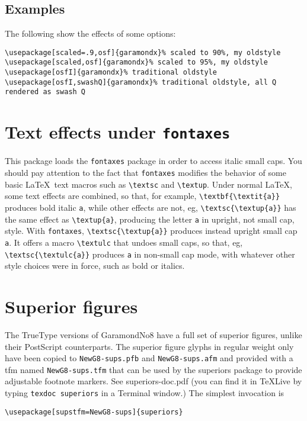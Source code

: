 \documentclass[11pt]{article}
\begin{document}
\subsection{Examples} The following show the effects of some options:

\begin{verbatim}
\usepackage[scaled=.9,osf]{garamondx}% scaled to 90%, my oldstyle
\usepackage[scaled,osf]{garamondx}% scaled to 95%, my oldstyle
\usepackage[osfI]{garamondx}% traditional oldstyle
\usepackage[osfI,swashQ]{garamondx}% traditional oldstyle, all Q rendered as swash Q
\end{verbatim}
\section{Text effects under \texttt{fontaxes}}
This package loads the {\tt fontaxes} package in order to access italic small caps. You should pay attention to the fact that {\tt fontaxes} modifies the behavior of some basic \LaTeX\ text macros such as \verb|\textsc| and \verb|\textup|. Under normal \LaTeX, some text effects are combined, so that, for example, \verb|\textbf{\textit{a}}| produces bold italic {\tt a}, while other effects are not, eg, \verb|\textsc{\textup{a}}| has the same effect as \verb|\textup{a}|, producing the letter {\tt a} in upright, not small cap, style. With {\tt fontaxes}, \verb|\textsc{\textup{a}}| produces instead upright small cap {\tt a}. It offers a macro \verb|\textulc| that undoes small caps, so that, eg, \verb|\textsc{\textulc{a}}| produces {\tt a} in non-small cap mode, with whatever other style choices were in force, such as bold or italics.

\section{Superior figures}
The TrueType versions of GaramondNo8 have a full set of superior figures, unlike their PostScript counterparts. The superior figure glyphs in regular weight only have been copied to \texttt{NewG8-sups.pfb} and \texttt{NewG8-sups.afm} and provided with a tfm named \texttt{NewG8-sups.tfm} that can be used by the \textsf{superiors} package to provide adjustable footnote markers. See \textsf{superiors-doc.pdf} (you can find it in \TeX Live by typing \texttt{texdoc superiors} in a Terminal window.) The simplest invocation is
\begin{verbatim}
\usepackage[supstfm=NewG8-sups]{superiors}
\end{verbatim}
\end{document}
